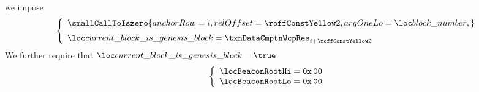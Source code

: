 \item[\underline{\underline{Detecting the genesis block:}}]
	we impose
	\[
		\left\{ \begin{array}{l}
			\smallCallToIszero {
				anchorRow = i                          ,
				relOffset = \FSEEgenesisBlockRowOffset ,
				argOneLo  = \locBlockNumber            ,
			}
			\vspace{2mm} \\
			\locCurrentBlockIsGenesisBlock
			=
			\txnDataCmptnWcpRes _{i + \FSEEgenesisBlockRowOffset} \\
		\end{array} \right.
	\]
	We further require that
	\If $\locCurrentBlockIsGenesisBlock = \true$
	\Then
	\[
		\left\{ \begin{array}{l}
			\locBeaconRootHi = \texttt{0x\,00} \\
			\locBeaconRootLo = \texttt{0x\,00} \\
		\end{array} \right.
	\]
